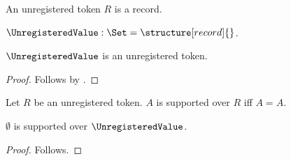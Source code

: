 

\begin{struct}\label{unregistered_token}
    An unregistered token $R$ is a record.
\end{struct}

\begin{definition}\label{unregistered_value}
    $\UnregisteredValue:\Set=\structure[record]{}$.
\end{definition}

\begin{proposition}\label{unregistered_value_theorem}
    $\UnregisteredValue$ is an unregistered token.
\end{proposition}
\begin{proof}
    Follows by .
\end{proof}

\begin{definition}\label{unregistered_guard}
    Let $R$ be an unregistered token.
    $A$ is supported over $R$ iff $A=A$.
\end{definition}

\begin{proposition}\label{unregistered_guard_rejected}
    $\emptyset$ is supported over $\UnregisteredValue$.
\end{proposition}
\begin{proof}
    Follows.
\end{proof}

